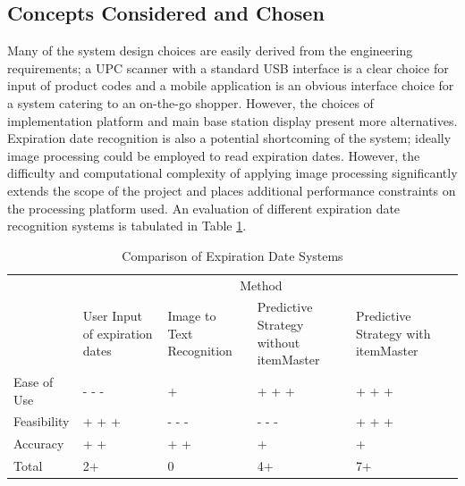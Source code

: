 \documentclass[11pt]{article} %
\begin{document}
\subsection{Concepts Considered and Chosen}
Many of the system design choices are easily derived from the engineering requirements; a UPC scanner with a standard USB interface is a clear choice for input of product codes and a mobile application is an obvious interface choice for a system catering to an on-the-go shopper. However, the choices of implementation platform and main base station display present more alternatives. Expiration date recognition is also a potential shortcoming of the system; ideally image processing could be employed to read expiration dates. However, the difficulty and computational complexity of applying image processing significantly extends the scope of the project and places additional performance constraints on the processing platform used. An evaluation of different expiration date recognition systems is tabulated in Table \ref{tab:datesys}.
\begin{table}[h!]
\vspace{0.5cm}
\caption{Comparison of Expiration Date Systems}
\begin{tabular}{| p{1in} | p{1.15in} | p{1.15in} | p{1.15in} | p{1.15in}  | p{1.15in} |}
\cline{2-5}
\multicolumn{1}{c}{}&\multicolumn{4}{|c|}{Method} \\
\cline{2-5}
\multicolumn{1}{c|}{}&User Input \newline of expiration \newline dates& Image to Text \newline Recognition & Predictive \newline Strategy without \newline itemMaster& Predictive \newline Strategy with \newline itemMaster \\
\hline
Ease of Use&- - -&+&+ + +&+ + +\\
\hline
Feasibility&+ + +&- - -&- - -&+ + +\\
\hline
Accuracy & + + & + + &+&+\\
\hline \hline
Total &2+ &0&4+&7+\\
\hline
\end{tabular}
\label{tab:datesys}
\end{table}
\newline \quad \newline
\end{document}
